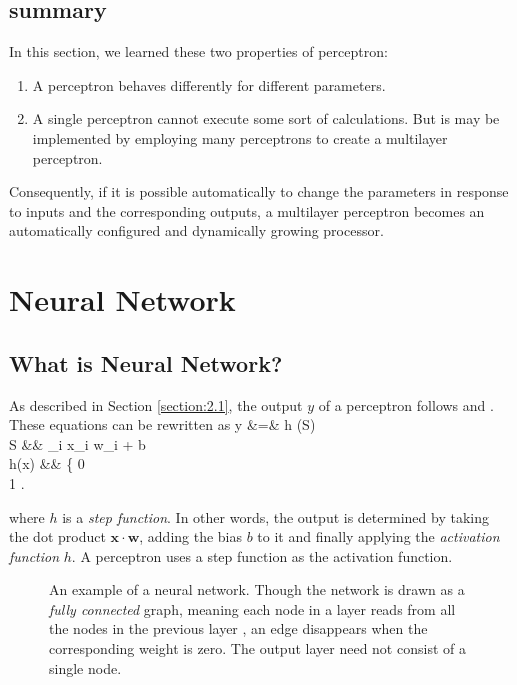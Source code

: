 \documentclass{article}
\theoremstyle{definition}
\newcommand{\sect}[1]{Section \ref{section:#1}}
\begin{document}
\subsection{summary}

In this section, we learned these two properties of perceptron:
\begin{enumerate}
\item A perceptron behaves differently for different parameters.
\item A single perceptron cannot execute some sort of calculations. But is may be implemented by employing many perceptrons to create a multilayer perceptron.
\end{enumerate}

Consequently, if it is possible automatically to change the parameters in response to inputs and the corresponding outputs, a multilayer perceptron becomes an automatically configured and dynamically growing processor.


\enterr
\section{Neural Network}

\subsection{What is Neural Network?}

As described in \sect{2.1}, the output $y$ of a perceptron follows  and . These equations can be rewritten as
\begineq
y &=& h (S)  \\
S &\equiv& \sum _i x_i w_i + b  \\
h(x) &\equiv& \left\{  0  \\ 1  \edarray \right. 
\edeq

where $h$ is a {\it step function}. In other words, the output is determined by taking the dot product $\bm{x} \cdot \bm{w}$, adding the bias $b$ to it and finally applying the {\it activation function} $h$. A perceptron uses a step function as the activation function.\\

\begin{figure}[H]
    \centering
    \begin{subfigure}[H]{1.0\textwidth}
	\end{subfigure}
    \caption{An example of a neural network. Though the network is drawn as a {\it fully connected} graph, meaning each node in a layer reads from all the nodes in the previous layer \cite{6}, an edge disappears when the corresponding weight is zero. The output layer need not consist of a single node.}
    \label{fig:3.1}
\end{figure}
\end{document}
